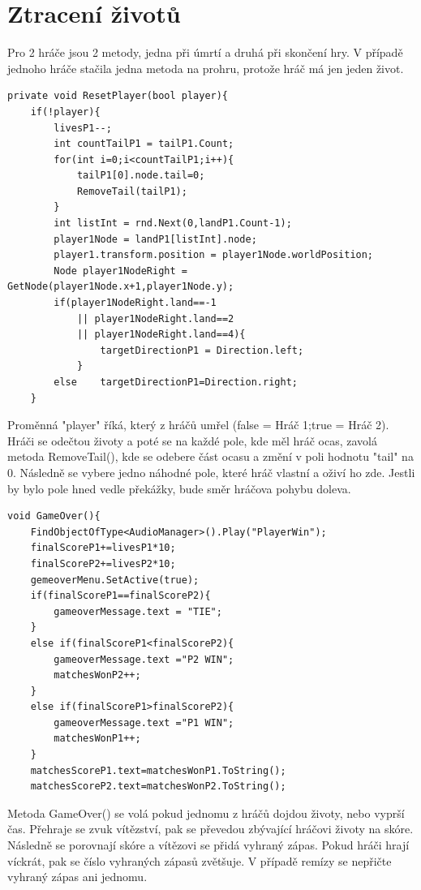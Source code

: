 \documentclass[12pt,a4paper]{report}
\begin{document}
\section{Ztracení životů}
Pro 2 hráče jsou 2 metody, jedna při úmrtí a druhá při skončení hry.
V případě jednoho hráče stačila jedna metoda na prohru, protože hráč má jen jeden život.
\begin{lstlisting}
private void ResetPlayer(bool player){
    if(!player){
        livesP1--;
        int countTailP1 = tailP1.Count;
        for(int i=0;i<countTailP1;i++){
            tailP1[0].node.tail=0;
            RemoveTail(tailP1);
        }
        int listInt = rnd.Next(0,landP1.Count-1);
        player1Node = landP1[listInt].node;
        player1.transform.position = player1Node.worldPosition;
        Node player1NodeRight = GetNode(player1Node.x+1,player1Node.y);
        if(player1NodeRight.land==-1 
            || player1NodeRight.land==2 
            || player1NodeRight.land==4){
                targetDirectionP1 = Direction.left;
            }
        else    targetDirectionP1=Direction.right;
    }
\end{lstlisting}
Proměnná "player" říká, který z hráčů umřel (false = Hráč 1;true = Hráč 2).
Hráči se odečtou životy a poté se na každé pole, kde měl hráč ocas, zavolá metoda RemoveTail(),
kde se odebere část ocasu a změní v poli hodnotu "tail" na 0.
Následně se vybere jedno náhodné pole, které hráč vlastní a oživí ho zde.
Jestli by bylo pole hned vedle překážky, bude směr hráčova pohybu doleva.
\begin{lstlisting}
void GameOver(){
    FindObjectOfType<AudioManager>().Play("PlayerWin");
    finalScoreP1+=livesP1*10;
    finalScoreP2+=livesP2*10;
    gemeoverMenu.SetActive(true);
    if(finalScoreP1==finalScoreP2){
        gameoverMessage.text = "TIE";
    }
    else if(finalScoreP1<finalScoreP2){
        gameoverMessage.text ="P2 WIN";
        matchesWonP2++;
    }
    else if(finalScoreP1>finalScoreP2){
        gameoverMessage.text ="P1 WIN";   
        matchesWonP1++;
    }
    matchesScoreP1.text=matchesWonP1.ToString();
    matchesScoreP2.text=matchesWonP2.ToString();
\end{lstlisting}
Metoda GameOver() se volá pokud jednomu z hráčů dojdou životy, nebo vyprší čas.
Přehraje se zvuk vítězství, pak se převedou zbývající hráčovi životy na skóre.
Následně se porovnají skóre a vítězovi se přidá vyhraný zápas.
Pokud hráči hrají víckrát, pak se číslo vyhraných zápasů zvětšuje.
V případě remízy se nepřičte vyhraný zápas ani jednomu.
\end{document}

